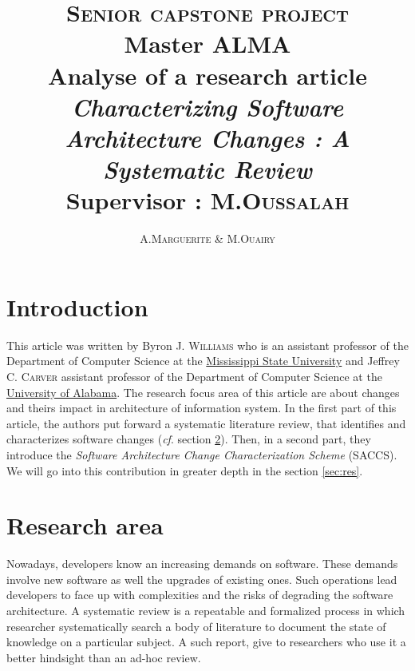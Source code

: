 \documentclass[12pt]{article}
\title{ {\huge \textsc{Senior capstone project}} \\  Master ALMA  \\ \textbf{Analyse of a research article} \\ \emph{Characterizing Software Architecture Changes : A Systematic Review}\\{\small Supervisor :  M.\textsc{Oussalah}}}
\author{A.\textsc{Marguerite} \& M.\textsc{Ouairy}}
\newcommand{\cf}{\emph{cf}.}
\begin{document}
\maketitle
\renewcommand{\labelitemi}{$\bullet$} 



\section{Introduction}\label{sec:intro}
This article was written by Byron J. \textsc{Williams} who is an assistant professor of the Department of Computer Science at the \href{http://www.msstate.edu/}{Mississippi State University} and Jeffrey C. \textsc{Carver} assistant professor of the Department of Computer Science at the \href{http://www.ua.edu/}{University of Alabama}. The research focus area of this article are about changes and theirs impact in architecture of information system. In the first part of this article, the authors put forward a systematic literature review, that identifies and characterizes software changes (\cf{} section \ref{sec:pblm}). Then, in a second part, they introduce the \emph{Software Architecture Change Characterization Scheme} (SACCS). We will go into this contribution in greater depth in the section \ref{sec:res}. 



\section{Research area}\label{sec:pblm}
Nowadays, developers know an increasing demands on software. These demands involve new software as well the upgrades of existing ones. Such operations lead developers to face up with complexities and the risks of degrading the software architecture. A systematic review is a repeatable and formalized process in which researcher systematically search a body of literature to document the state of knowledge on a particular subject. A such report, give to researchers who use it a better hindsight than an ad-hoc review.%
\end{document}
